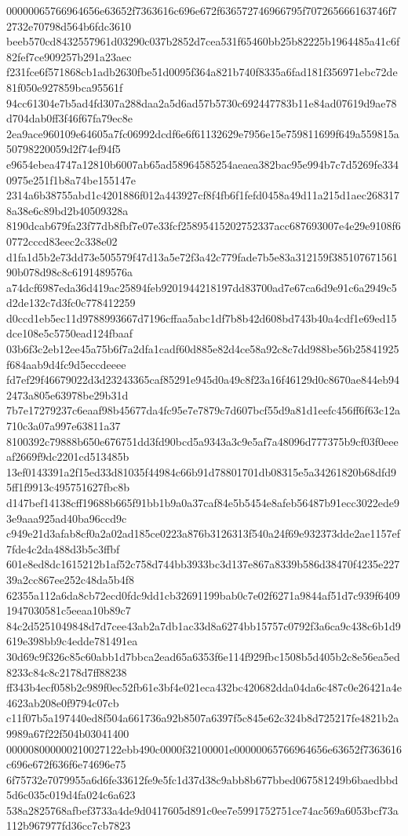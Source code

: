 {00000065766964656e63652f7363616c696e672f636572746966795f707265666163746f72732e70798d564b6fdc3610
beeb570cd8432557961d03290c037b2852d7cea531f65460bb25b82225b1964485a41c6f82fef7ce909257b291a23aec
f231fce6f571868cb1adb2630fbe51d0095f364a821b740f8335a6fad181f356971ebc72de81f050e927859bca95561f
94cc61304e7b5ad4fd307a288daa2a5d6ad57b5730c692447783b11e84ad07619d9ae78d704dab0ff3f46f67fa79ec8e
2ea9ace960109e64605a7fc06992dcdf6e6f61132629e7956e15e759811699f649a559815a50798220059d2f74ef94f5
e9654ebea4747a12810b6007ab65ad58964585254aeaea382bac95e994b7c7d5269fe3340975e251f1b8a74be155147e
2314a6b38755abd1c4201886f012a443927cf8f4fb6f1fefd0458a49d11a215d1aec2683178a38e6c89bd2b40509328a
8190dcab679fa23f77db8fbf7e07e33fcf25895415202752337acc687693007e4e29e9108f60772cccd83eec2c338e02
d1fa1d5b2e73dd73e505579f47d13a5e72f3a42c779fade7b5e83a312159f38510767156190b078d98c8c6191489576a
a74dcf6987eda36d419ac25894feb9201944218197dd83700ad7e67ca6d9e91c6a2949c5d2de132c7d3fc0c778412259
d0ccd1eb5ec11d9788993667d7196cffaa5abc1df7b8b42d608bd743b40a4cdf1e69ed15dce108e5c5750ead124fbaaf
03b6f3c2eb12ee45a75b6f7a2dfa1cadf60d885e82d4ce58a92c8c7dd988be56b25841925f684aab9d4fc9d5eccdeeee
fd7ef29f46679022d3d23243365caf85291e945d0a49c8f23a16f46129d0c8670ae844eb942473a805e63978be29b31d
7b7e17279237c6eaaf98b45677da4fc95e7e7879c7d607bcf55d9a81d1eefc456ff6f63c12a710c3a07a997e63811a37
8100392c79888b650e676751dd3fd90bcd5a9343a3c9e5af7a48096d777375b9cf03f0eeeaf2669f9dc2201cd513485b
13ef0143391a2f15ed33d81035f44984c66b91d78801701db08315e5a34261820b68dfd95ff1f9913c495751627fbc8b
d147bef14138cff19688b665f91bb1b9a0a37caf84e5b5454e8afeb56487b91ecc3022ede93e9aaa925ad40ba96ccd9c
c949e21d3afab8cf0a2a02ad185ce0223a876b3126313f540a24f69e932373dde2ae1157ef7fde4c2da488d3b5c3ffbf
601e8ed8dc1615212b1af52c758d744bb3933bc3d137e867a8339b586d38470f4235e22739a2cc867ee252c48da5b4f8
62355a112a6da8cb72ecd0fdc9dd1cb32691199bab0c7e02f6271a9844af51d7c939f64091947030581c5eeaa10b89c7
84c2d5251049848d7d7cee43ab2a7db1ac33d8a6274bb15757c0792f3a6ca9c438c6b1d9619e398bb9c4edde781491ea
30d69c9f326c85c60abb1d7bbca2ead65a6353f6e114f929fbc1508b5d405b2c8e56ea5ed8233c84c8c2178d7ff88238
ff343b4ecf058b2c989f0ec52fb61e3bf4e021eca432bc420682dda04da6c487c0e26421a4e4623ab208e0f9794c07cb
c11f07b5a197440ed8f504a661736a92b8507a6397f5c845e62c324b8d725217fe4821b2a9989a67f22f504b03041400
000008000000210027122ebb490c0000f32100001e00000065766964656e63652f7363616c696e672f636f6e74696e75
6f75732e7079955a6d6fe33612fe9e5fc1d37d38c9abb8b677bbed067581249b6baedbbd5d6c035c019d4fa024c6a623
538a2825768afbef3733a4de9d0417605d891c0ee7e5991752751ce74ac569a6053bcf73a112b967977fd36cc7cb7823
}
